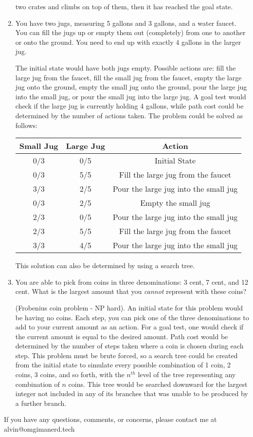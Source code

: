 \documentclass{math}
\begin{document}
\begin{enumerate}
  two crates and climbs on top of them, then it has reached the goal state.
  \item You have two jugs, measuring 5 gallons and 3 gallons, and a water
  faucet. You can fill the jugs up or empty them out (completely) from one to
  another or onto the ground. You need to end up with exactly 4 gallons in the
  larger jug.
  \par The initial state would have both jugs empty. Possible actions are: fill
  the large jug from the faucet, fill the small jug from the faucet, empty the
  large jug onto the ground, empty the small jug onto the ground, pour the
  large jug into the small jug, or pour the small jug into the large jug. A goal
  test would check if the large jug is currently holding 4 gallons, while path
  cost could be determined by the number of actions taken. The problem could be
  solved as follows:
  \begin{center}
    \begin{tabular}{|c|c|c|}
      \hline
      Small Jug & Large Jug & Action \\ \hline
      0/3 & 0/5 & Initial State \\ \hline
      0/3 & 5/5 & Fill the large jug from the faucet \\ \hline
      3/3 & 2/5 & Pour the large jug into the small jug \\ \hline
      0/3 & 2/5 & Empty the small jug \\ \hline
      2/3 & 0/5 & Pour the large jug into the small jug \\ \hline
      2/3 & 5/5 & Fill the large jug from the faucet \\ \hline
      3/3 & 4/5 & Pour the large jug into the small jug \\ \hline
    \end{tabular}
  \end{center}
  This solution can also be determined by using a search tree.
  \item You are able to pick from coins in three denominations: 3 cent, 7 cent,
  and 12 cent. What is the largest amount that you \textit{cannot} represent
  with these coins?
  \par (Frobenius coin problem - NP hard). An initial state for this problem
  would be having no coins. Each step, you can pick one of the three
  denominations to add to your current amount as an action. For a goal test,
  one would check if the current amount is equal to the desired amount. Path
  cost would be determined by the number of steps taken where a coin is chosen
  during each step. This problem must be brute forced, so a search tree could
  be created from the initial state to simulate every possible combination of
  1 coin, 2 coins, 3 coins, and so forth, with the \( n^{th} \) level of the
  tree representing any combination of \( n \) coins. This tree would be
  searched downward for the largest integer not included in any of its branches
  that was unable to be produced by a further branch.
\end{enumerate}

\begin{center}
  If you have any questions, comments, or concerns, please contact me at
  alvin@omgimanerd.tech
\end{center}
\end{document}
